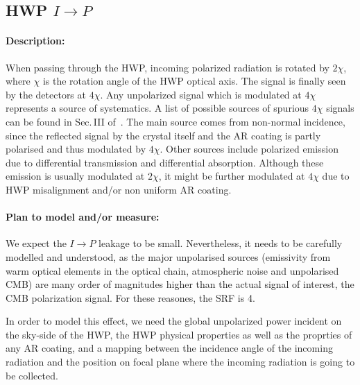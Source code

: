 \subsection{HWP $I\rightarrow P$}
\label{IP downstream of HWP}
\paragraph{Description:}
When passing through the HWP, incoming polarized radiation is rotated by $2\chi$, where $\chi$ is the rotation angle of the HWP optical axis. The signal is finally seen by the detectors at $4\chi$. Any unpolarized signal which is modulated at $4\chi$ represents a source of systematics. A list of possible sources of spurious $4\chi$ signals can be found in Sec.\,III of~\cite{Kusaka_ABS}. The main source comes from non-normal incidence, since the reflected signal by the crystal itself and the AR coating is partly polarised and thus modulated by $4\chi$. Other sources include polarized emission due to differential transmission and differential absorption. Although these emission is usually modulated at $2\chi$, it might be further modulated at $4\chi$ due to HWP misalignment and/or non uniform AR coating.

\paragraph{Plan to model and/or measure:}
We expect the $I\rightarrow P$ leakage to be small. Nevertheless, it needs to be carefully modelled and understood, as the major unpolarised sources (emissivity from warm optical elements in the optical chain, atmospheric noise and unpolarised CMB) are many order of magnitudes higher than the actual signal of interest, the CMB polarization signal. For these reasones, the SRF is 4.

In order to model this effect, we need the global unpolarized power incident on the sky-side of the HWP, the HWP physical properties as well as the proprties of any AR coating, and a mapping between the incidence angle of the incoming radiation and the position on focal plane where the incoming radiation is going to be collected. 

